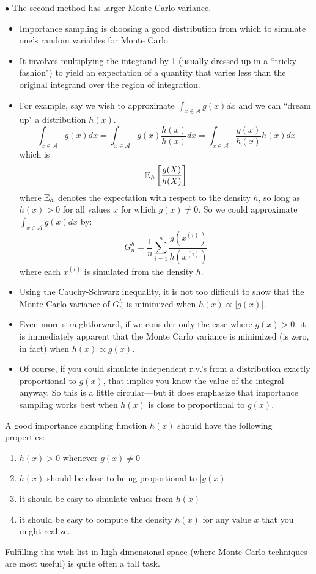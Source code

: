 $\bullet$ The second method has larger Monte Carlo variance.

\begin{itemize}
\item Importance sampling is choosing a good
distribution from which to simulate one's random variables for Monte Carlo.
\item It involves
multiplying the integrand by 1 (usually dressed up in a ``tricky
fashion") to yield an expectation of a quantity that varies less than the
original integrand over the region of integration.

\item For example, say we wish to approximate $\int_{x\in\mathcal A}g(x)dx$ and we can ``dream up" a distribution $h(x)$.
\[
\int_{x\in\mathcal A}g(x)dx = \int_{x\in\mathcal A}g(x)\frac{h(x)}{h(x)}dx 
= \int_{x\in\mathcal A}\frac{g(x)}{h(x)}h(x)dx
\]
which is
\[
\Bbb{E}_h\left[\frac{g(X)}{h(X)}\right]
\]
where $\Bbb{E}_h$ denotes the expectation with respect to the density $h$, so long as $h(x)>0$ for all values $x$ for which $g(x)\neq 0$.
\newpage
So we could approximate $\int_{x\in\mathcal A}g(x)dx$ by:
\[
G_n^h = \frac{1}{n} \sum_{i=1}^n  \frac{g(x^{(i)})}{h(x^{(i)})}
\]
where each $x^{(i)}$ is simulated from the density $h$. 

\item Using the Cauchy-Schwarz inequality, it is not too difficult to show that the Monte Carlo variance of $G_n^h$ is minimized when $h(x)\propto |g(x)|$.

\item Even more straightforward, if we consider only the case where $g(x)>0$, it is immediately apparent that the Monte Carlo variance is minimized (is zero, in fact) when $h(x)\propto g(x)$.  

\item Of course, if you could simulate independent r.v.'s from a distribution exactly proportional to $g(x)$, that implies you know the value of the integral anyway. So this is a little circular---but it does emphasize that importance sampling works best when $h(x)$ is close to proportional to $g(x)$. 
\end{itemize}

A good importance sampling function $h(x)$ should have the following
properties:
\begin{enumerate}
\item $h(x) > 0$ whenever $g(x) \neq 0$
\item $h(x)$ should be close to being proportional to $|g(x)|$
\item it should be easy to simulate values from $h(x)$
\item it should be easy to compute the density $h(x)$ for any value $x$ that you
might realize.
\end{enumerate}
Fulfilling this wish-list in high dimensional space (where Monte Carlo techniques
are most useful) is quite often a tall task.

